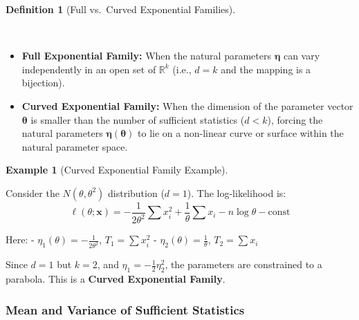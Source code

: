 \documentclass[
  letterpaper,
  DIV=11,
  numbers=noendperiod]{scrreprt}
\providecommand{\tightlist}{%
  \setlength{\itemsep}{0pt}\setlength{\parskip}{0pt}}
\renewcommand{\[}{\begin{equation}}
\renewcommand{\]}{\end{equation}}
\theoremstyle{definition}
\newtheorem{definition}{Definition}[chapter]
\theoremstyle{plain}
\theoremstyle{plain}
\theoremstyle{plain}
\theoremstyle{definition}
\newtheorem{example}{Example}[chapter]
\theoremstyle{plain}
\theoremstyle{remark}
\begin{document}
\begin{definition}[Full vs.~Curved Exponential
Families]\protect\hypertarget{def-curvedexpfam}{}\label{def-curvedexpfam}

~

\begin{itemize}
\tightlist
\item
  \textbf{Full Exponential Family:} When the natural parameters
  \(\boldsymbol{\eta}\) can vary independently in an open set of
  \(\mathbb{R}^k\) (i.e., \(d=k\) and the mapping is a bijection).
\item
  \textbf{Curved Exponential Family:} When the dimension of the
  parameter vector \(\boldsymbol{\theta}\) is smaller than the number of
  sufficient statistics (\(d < k\)), forcing the natural parameters
  \(\boldsymbol{\eta}(\boldsymbol{\theta})\) to lie on a non-linear
  curve or surface within the natural parameter space.
\end{itemize}

\end{definition}

\begin{example}[Curved Exponential Family
Example]\protect\hypertarget{exm-curved-normal-natural}{}\label{exm-curved-normal-natural}

Consider the \(N(\theta, \theta^2)\) distribution (\(d=1\)). The
log-likelihood is: \[
\ell(\theta; \mathbf{x}) = -\frac{1}{2\theta^2} \sum x_i^2 + \frac{1}{\theta} \sum x_i - n \log \theta - \text{const}
\]

Here: - \(\eta_1(\theta) = -\frac{1}{2\theta^2}\), \(T_1 = \sum x_i^2\)
- \(\eta_2(\theta) = \frac{1}{\theta}\), \(T_2 = \sum x_i\)

Since \(d=1\) but \(k=2\), and \(\eta_1 = -\frac{1}{2}\eta_2^2\), the
parameters are constrained to a parabola. This is a \textbf{Curved
Exponential Family}.

\end{example}

\subsubsection{Mean and Variance of Sufficient
Statistics}\label{mean-and-variance-of-sufficient-statistics}
\end{document}
